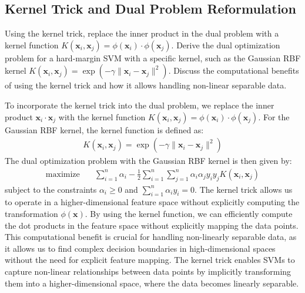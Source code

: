 \subsection{Kernel Trick and Dual Problem Reformulation}
Using the kernel trick, replace the inner product in the dual problem with a kernel function $K(\mathbf{x}_i, \mathbf{x}_j) = \phi(\mathbf{x}_i) \cdot \phi(\mathbf{x}_j)$. Derive the dual optimization problem for a hard-margin SVM with a specific kernel, such as the Gaussian RBF kernel $K(\mathbf{x}_i, \mathbf{x}_j) = \exp(-\gamma \|\mathbf{x}_i - \mathbf{x}_j\|^2)$. Discuss the computational benefits of using the kernel trick and how it allows handling non-linear separable data.
\begin{qsolve}
    \begin{qsolve}[]
        To incorporate the kernel trick into the dual problem, we replace the inner product $\mathbf{x}_i \cdot \mathbf{x}_j$ with the kernel function $K(\mathbf{x}_i, \mathbf{x}_j) = \phi(\mathbf{x}_i) \cdot \phi(\mathbf{x}_j)$. For the Gaussian RBF kernel, the kernel function is defined as:
        \begin{align*}
            K(\mathbf{x}_i, \mathbf{x}_j) = \exp(-\gamma \|\mathbf{x}_i - \mathbf{x}_j\|^2)
        \end{align*}
        The dual optimization problem with the Gaussian RBF kernel is then given by:
        \begin{align*}
            \text{maximize} \quad & \sum_{i=1}^{n} \alpha_i - \frac{1}{2} \sum_{i=1}^{n} \sum_{j=1}^{n} \alpha_i \alpha_j y_i y_j K(\mathbf{x}_i, \mathbf{x}_j)
        \end{align*}
        subject to the constraints $\alpha_i \geq 0$ and $\sum_{i=1}^{n} \alpha_i y_i = 0$.
        The kernel trick allows us to operate in a higher-dimensional feature space without explicitly computing the transformation $\phi(\mathbf{x})$. By using the kernel function, we can efficiently compute the dot products in the feature space without explicitly mapping the data points.
        \splitqsolve[\splitqsolve]
        This computational benefit is crucial for handling non-linearly separable data, as it allows us to find complex decision boundaries in high-dimensional spaces without the need for explicit feature mapping. The kernel trick enables SVMs to capture non-linear relationships between data points by implicitly transforming them into a higher-dimensional space, where the data becomes linearly separable.
    \end{qsolve}
\end{qsolve}
